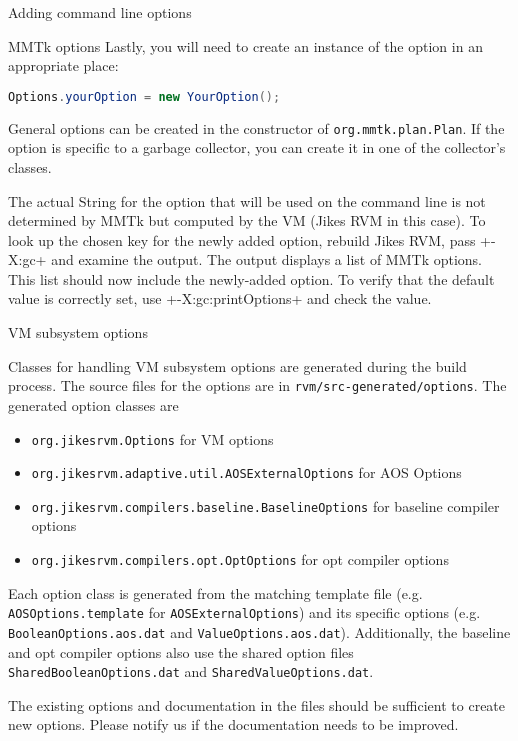 \begin{section}{Adding command line options}
\begin{subsection}{MMTk options}
Lastly, you will need to create an instance of the option in an appropriate place:
\begin{lstlisting}[language=Java]
Options.yourOption = new YourOption();
\end{lstlisting}
General options can be created in the constructor of \texttt{org.mmtk.plan.Plan}. If the option is specific to a garbage collector, you can create it in one of the collector's classes.

The actual String for the option that will be used on the command line is not determined by MMTk but computed by the VM (Jikes RVM in this case). To look up the chosen key for the newly added option, rebuild Jikes RVM, pass \spverb+-X:gc+ and examine the output. The output displays a list of MMTk options. This list should now include the newly-added option. To verify that the default value is correctly set, use \spverb+-X:gc:printOptions+ and check the value.

\end{subsection}

\begin{subsection}{VM subsystem options}

Classes for handling VM subsystem options are generated during the build process. The source files for the options are in \texttt{rvm/src-generated/options}. The generated option classes are
\begin{itemize}
  \item \texttt{org.jikes\-rvm.Options} for VM options
  \item \texttt{org.jikes\-rvm.adaptive.util.AOS\-Ex\-ter\-nal\-Options} for AOS Options
  \item \texttt{org.jikes\-rvm.com\-pi\-lers.ba\-se\-li\-ne.Ba\-se\-li\-ne\-Options} for baseline compiler options
  \item \texttt{org.jikes\-rvm.com\-pi\-lers.opt.Opt\-Options} for opt compiler options
\end{itemize}

Each option class is generated from the matching template file (e.g. \texttt{AOS\-Options.tem\-pla\-te} for \texttt{AOS\-Ex\-ter\-nal\-Options}) and its specific options (e.g. \texttt{Boo\-lean\-Options.aos.dat} and \texttt{Value\-Options.aos.dat}). Additionally, the baseline and opt compiler options also use the shared option files \texttt{Sha\-red\-Boo\-lean\-Options.dat} and \texttt{Sha\-red\-Va\-lue\-Options.dat}.

The existing options and documentation in the files should be sufficient to create new options. Please notify us if the documentation needs to be improved.


\end{subsection}
\end{section}
